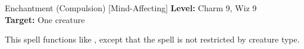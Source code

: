 {Enchantment (Compulsion) [Mind-Affecting]}
{
	\textbf{Level:}
	Charm 9, Wiz 9\\
	\textbf{Target:}
	One creature\\
}
{
	This spell functions like , except that the spell is not restricted by creature type.

}

